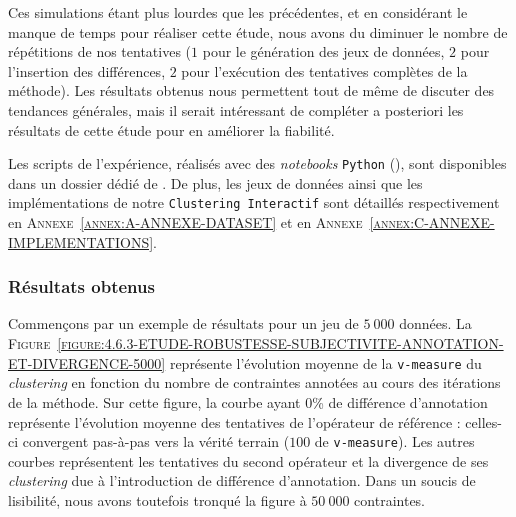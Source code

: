 			\begin{leftBarWarning}
				Ces simulations étant plus lourdes que les précédentes, et en considérant le manque de temps pour réaliser cette étude, nous avons du diminuer le nombre de répétitions de nos tentatives ($1$ pour le génération des jeux de données, $2$ pour l'insertion des différences, $2$ pour l'exécution des tentatives complètes de la méthode).
				Les résultats obtenus nous permettent tout de même de discuter des tendances générales, mais il serait intéressant de compléter a posteriori les résultats de cette étude pour en améliorer la fiabilité.
			\end{leftBarWarning}
			
			\begin{leftBarReminder}
				Les scripts de l'expérience, réalisés avec des \textit{notebooks} \texttt{Python} (\cite{van-rossum-drake:2009:python-reference-manual}), sont disponibles dans un dossier dédié de \cite{schild:2021:cognitivefactory-interactiveclusteringcomparativestudy}.
				De plus, les jeux de données ainsi que les implémentations de notre \texttt{Clustering Interactif} sont détaillés respectivement en \textsc{Annexe~\ref{annex:A-ANNEXE-DATASET}} et en \textsc{Annexe~\ref{annex:C-ANNEXE-IMPLEMENTATIONS}}.
			\end{leftBarReminder}
		
		
		\subsubsection{Résultats obtenus}
			
			Commençons par un exemple de résultats pour un jeu de $5~000$ données.
			La \textsc{Figure~\ref{figure:4.6.3-ETUDE-ROBUSTESSE-SUBJECTIVITE-ANNOTATION-ET-DIVERGENCE-5000}} représente l'évolution moyenne de la \texttt{v-measure} du \textit{clustering} en fonction du nombre de contraintes annotées au cours des itérations de la méthode.
			Sur cette figure, la courbe ayant $0$\% de différence d'annotation représente l'évolution moyenne des tentatives de l'opérateur de référence : celles-ci convergent pas-à-pas vers la vérité terrain ($100$ de \texttt{v-measure}).
			Les autres courbes représentent les tentatives du second opérateur et la divergence de ses \textit{clustering} due à l'introduction de différence d'annotation.
			Dans un soucis de lisibilité, nous avons toutefois tronqué la figure à $50~000$ contraintes.

